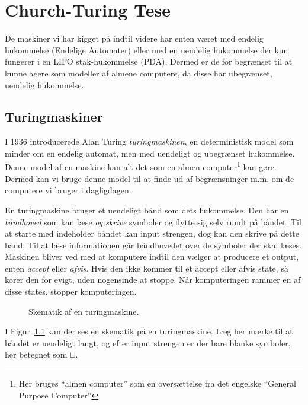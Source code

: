 \chapter{Church-Turing Tese}

De maskiner vi har kigget på indtil videre har enten været med endelig hukommelse (Endelige Automater) eller med en uendelig hukommelse der kun fungerer i en LIFO stak-hukommelse (PDA). Dermed er de for begrænset til at kunne agere som modeller af almene computere, da disse har ubegrænset, uendelig hukommelse.

\section{Turingmaskiner}%
\label{sec:turingmachines}

I 1936 introducerede Alan Turing \textit{turingmaskinen}, en deterministisk model som minder om en endelig automat, men med uendeligt og ubegrænset hukommelse. Denne model af en maskine kan alt det som en almen computer\footnote{Her bruges ``almen computer'' som en oversættelse fra det engelske ``General Purpose Computer''} kan gøre. Dermed kan vi bruge denne model til at finde ud af begrænsninger m.m. om de computere vi bruger i dagligdagen.

En turingmaskine bruger et uendeligt bånd som dets hukommelse. Den har en \textit{båndhoved} som kan læse \textit{og skrive} symboler og flytte sig selv rundt på båndet. Til at starte med indeholder båndet kan input strengen, dog kan den skrive på dette bånd. Til at læse informationen går båndhovedet over de symboler der skal læses. Maskinen bliver ved med at komputere indtil den vælger at producere et output, enten \textit{accept} eller \textit{afvis}. Hvis den ikke kommer til et accept eller afvis state, så kører den for evigt, uden nogensinde at stoppe. Når komputeringen rammer en af disse states, stopper komputeringen.

\begin{figure}[ht]
	\centering
	\caption{\label{fig:turingschematic} Skematik af en turingmaskine.}
\end{figure}
I Figur~\ref{fig:turingschematic} kan der ses en skematik på en turingmaskine. Læg her mærke til at båndet er uendeligt langt, og efter input strengen er der bare blanke symboler, her betegnet som $\sqcup$.

